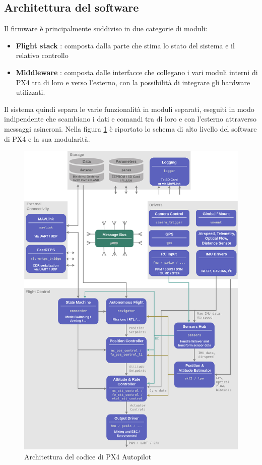 \begin{it}
	\section{Architettura del software}
	Il firmware è principalmente suddiviso in due categorie di moduli:
	\begin{itemize}
		\item \textbf{Flight stack} : composta dalla parte che stima lo stato del sistema e il relativo controllo
		\item \textbf{Middleware} : composta dalle interfacce che collegano i vari moduli interni di PX4 tra di loro e verso l'esterno, con la possibilità di integrare gli hardware utilizzati.
	\end{itemize}
	
	Il sistema quindi separa le varie funzionalità in moduli separati, eseguiti in modo indipendente che scambiano i dati e comandi tra di loro e con l'esterno attraverso messaggi asincroni.
	Nella figura \ref{fig:px4.architettura} è riportato lo schema di alto livello del software di PX4 e la sua modularità.
	
	\begin{figure}[ht]
		\centering
		\includegraphics[width=1\textwidth]{Contestualizzazione/Figure/PX4_Architecture}
		\caption{Architettura del codice di PX4 Autopilot}
		\label{fig:px4.architettura}
	\end{figure}

\end{it}
